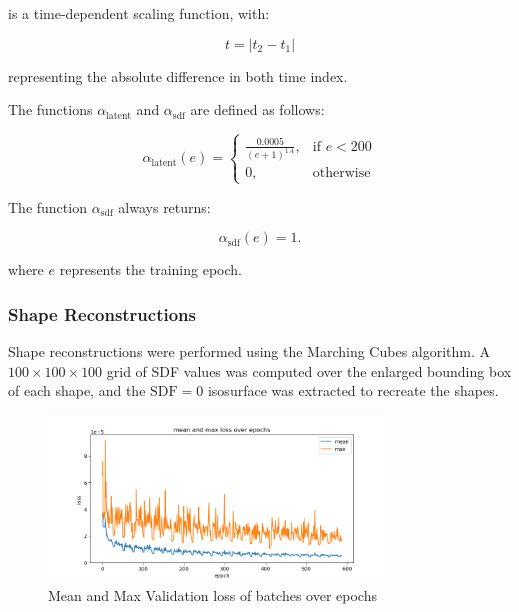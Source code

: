 \documentclass[a4paper,12pt]{article}
\begin{document}
is a time-dependent scaling function, with:

\begin{equation}
	t = |t_2 - t_1|
\end{equation}

representing the absolute difference in both time index.

The functions \( \alpha_{\text{latent}} \) and \( \alpha_{\text{sdf}} \) are defined as follows:

\begin{equation}
	\alpha_{\text{latent}}(e) =
	\begin{cases}
		\frac{0.0005}{(e + 1)^{1.4}}, & \text{if } e < 200 \\
		0,                            & \text{otherwise}
	\end{cases}
\end{equation}

The function \( \alpha_{\text{sdf}} \) always returns:

\begin{equation}
	\alpha_{\text{sdf}}(e) = 1.
\end{equation}

where \( e \) represents the training epoch.

\subsubsection*{Shape Reconstructions}

Shape reconstructions were performed using the Marching Cubes algorithm. A \( 100 \times 100 \times 100 \) grid of SDF values was computed over the enlarged bounding box of each shape, and the \( \text{SDF} = 0 \) isosurface was extracted to recreate the shapes.

\begin{figure}[h!]
	\centering
	\includegraphics[width=0.8\textwidth]{proj/7-loss}
	\caption{Mean and Max Validation loss of batches over epochs}
	\label{fig:validation_loss_tracking}
\end{figure}
\end{document}
